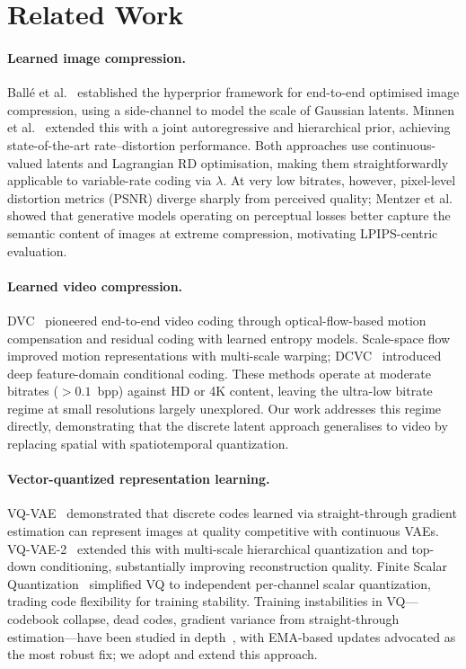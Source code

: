\documentclass{article}
\begin{document}
\section{Related Work}
\label{sec:related}

\paragraph{Learned image compression.}
Ball\'e et al.~\cite{balle2018variational} established the hyperprior framework
for end-to-end optimised image compression, using a side-channel to model the
scale of Gaussian latents.
Minnen et al.~\cite{minnen2018joint} extended this with a joint autoregressive
and hierarchical prior, achieving state-of-the-art rate--distortion performance.
Both approaches use continuous-valued latents and Lagrangian RD optimisation,
making them straightforwardly applicable to variable-rate coding via $\lambda$.
At very low bitrates, however, pixel-level distortion metrics (PSNR) diverge
sharply from perceived quality; Mentzer et al.~\cite{mentzer2020highfidelity}
showed that generative models operating on perceptual losses better capture
the semantic content of images at extreme compression, motivating LPIPS-centric
evaluation.

\paragraph{Learned video compression.}
DVC~\cite{dvc} pioneered end-to-end video coding through optical-flow-based
motion compensation and residual coding with learned entropy models.
Scale-space flow~\cite{scale_space_flow} improved motion representations
with multi-scale warping; DCVC~\cite{dcvc} introduced deep feature-domain
conditional coding.
These methods operate at moderate bitrates ($>0.1$~bpp) against HD or
4K content, leaving the ultra-low bitrate regime at small resolutions largely
unexplored.
Our work addresses this regime directly, demonstrating that the discrete latent
approach generalises to video by replacing spatial with spatiotemporal
quantization.

\paragraph{Vector-quantized representation learning.}
VQ-VAE~\cite{vqvae} demonstrated that discrete codes learned via
straight-through gradient estimation can represent images at quality
competitive with continuous VAEs.
VQ-VAE-2~\cite{vqvae2} extended this with multi-scale hierarchical
quantization and top-down conditioning, substantially improving
reconstruction quality.
Finite Scalar Quantization~\cite{mentzer2022vqcompression} simplified VQ
to independent per-channel scalar quantization, trading code flexibility for
training stability.
Training instabilities in VQ---codebook collapse, dead codes, gradient variance
from straight-through estimation---have been studied in depth~\cite{ema_vq},
with EMA-based updates advocated as the most robust fix; we adopt and extend
this approach.
\end{document}
